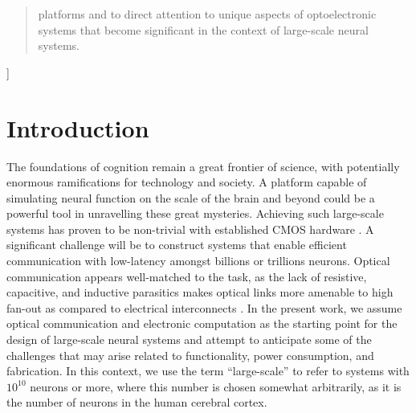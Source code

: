 \documentclass[twocolumn]{article}
\begin{document}
\begin{@twocolumnfalse}
\begin{abstract}
platforms and to direct attention to unique aspects of optoelectronic systems that become significant in the context of large-scale neural systems. 
\vspace{2em}
\end{abstract}
\end{@twocolumnfalse}
]

\setcounter{tocdepth}{4}
\setcounter{secnumdepth}{4}

\section{\label{sec:introduction}Introduction}

The foundations of cognition remain a great frontier of science, with potentially enormous ramifications for technology and society. A platform capable of simulating neural function on the scale of the brain and beyond could be a powerful tool in unravelling these great mysteries. Achieving such large-scale systems has proven to be non-trivial with established CMOS hardware \cite{furber2016large}. A significant challenge will be to construct systems that enable efficient communication with low-latency amongst billions or trillions neurons. Optical communication appears well-matched to the task, as the lack of resistive, capacitive, and inductive parasitics makes optical links more amenable to high fan-out as compared to electrical interconnects \cite{shainline2019superconducting}. In the present work, we assume optical communication and electronic computation as the starting point for the design of large-scale neural systems and attempt to anticipate some of the challenges that may arise related to functionality, power consumption, and fabrication. In this context, we use the term ``large-scale'' to refer to systems with $10^{10}$ neurons or more, where this number is chosen somewhat arbitrarily, as it is the number of neurons in the human cerebral cortex.
\end{document}
